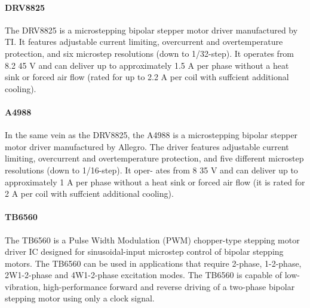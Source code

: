 \paragraph{DRV8825} 
The DRV8825 is a microstepping bipolar stepper motor driver manufactured by TI. 
It features adjustable current limiting, overcurrent and overtemperature protection, and six microstep resolutions (down to 1/32-step). 
It operates from 8.2 45 V and can deliver up to approximately 1.5 A per phase without a heat sink or forced air ﬂow (rated for up to 2.2 A per coil with suffcient additional cooling).

\paragraph{A4988}
In the same vein as the DRV8825, the A4988 is a microstepping bipolar stepper motor driver manufactured by Allegro. 
The driver features adjustable current limiting, overcurrent and overtemperature protection, and ﬁve different microstep resolutions (down to 1/16-step). 
It oper- ates from 8 35 V and can deliver up to approximately 1 A per phase without a heat sink or forced air ﬂow (it is rated for 2 A per coil with suffcient additional cooling).

\paragraph{TB6560} 
The TB6560 is a Pulse Width Modulation (PWM) chopper-type stepping motor driver IC designed for sinusoidal-input microstep control of bipolar stepping motors. 
The TB6560 can be used in applications that require 2-phase, 1-2-phase, 2W1-2-phase and 4W1-2-phase excitation modes. 
The TB6560 is capable of low-vibration, high-performance forward and reverse driving of a two-phase bipolar stepping motor using only a clock signal.
